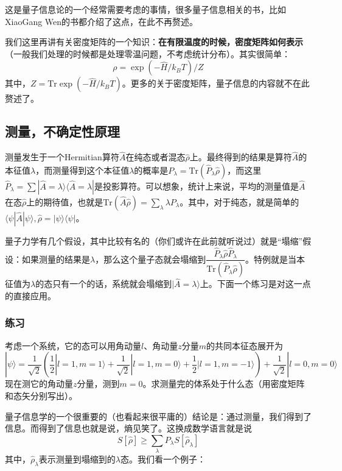 这是量子信息论的一个经常需要考虑的事情，很多量子信息相关的书，比如XiaoGang Wen的书\cite{2015arXiv150802595Z}都介绍了这点，在此不再赘述。


我们这里再讲有关密度矩阵的一个知识：{\bf 在有限温度的时候，密度矩阵如何表示}（一般我们处理的时候都是处理零温问题，不考虑统计分布）。其实很简单：
\begin{equation}
\rho=\exp{(-\hat{H}/k_BT)}/Z
\end{equation}
其中，$Z=\text{Tr}\exp{(-\hat{H}/k_BT)}$。更多的关于密度矩阵，量子信息的内容就不在此赘述了。


\subsection{测量，不确定性原理}

测量发生于一个Hermitian算符$\hat A$在纯态或者混态$\hat\rho$上。最终得到的结果是算符$\hat A$的本征值$\lambda$，而测量得到这个本征值$\lambda$的概率是$P_\lambda=\text{Tr}(\hat{P}_\lambda\hat\rho)$，而这里$\hat P_\lambda=\sum|\hat{A}=\lambda\rangle\langle\hat{A}=\lambda|$是投影算符。可以想象，统计上来说，平均的测量值是$\hat A$在态$\hat\rho$上的期待值，也就是$\text{Tr}(\hat A\hat\rho)=\sum_\lambda \lambda P_\lambda$。其中，对于纯态，就是简单的$\langle\psi|\hat A|\psi\rangle, \hat\rho=|\psi\rangle\langle\psi|$。

量子力学有几个假设，其中比较有名的（你们或许在此前就听说过）就是``塌缩''假设：如果测量的结果是$\lambda$，那么这个量子态就会塌缩到$\dfrac{\hat P_\lambda\hat\rho\hat P_\lambda}{\text{Tr}(\hat P_\lambda\hat\rho)}$。特例就是当本征值为$\lambda$的态只有一个的话，系统就会塌缩到$|\hat{A}=\lambda\rangle$上。下面一个练习是对这一点的直接应用。

\subsubsection{练习}
考虑一个系统，它的态可以用角动量$l$、角动量$z$分量$m$的共同本征态展开为
\begin{equation}
|\psi\rangle = \frac{1}{\sqrt{2}}\left(\frac{1}{2}|l=1,m=1\rangle+\frac{1}{\sqrt{2}}|l=1,m=0\rangle+\frac{1}{2}|l=1,m=-1\rangle\right) + \frac{1}{\sqrt{2}}|l=0,m=0\rangle
\end{equation}
现在测它的角动量$z$分量，测到$m=0$。求测量完的体系处于什么态（用密度矩阵和态矢分别写出）。


量子信息学的一个很重要的（也看起来很平庸的）结论是：通过测量，我们得到了信息。而得到了信息也就是说，熵见笑了。这换成数学语言就是说
\begin{equation}
S[\hat\rho]\ge\sum_\lambda P_\lambda S[\hat\rho_\lambda]
\end{equation}
其中，$\hat\rho_\lambda$表示测量到塌缩到的$\lambda$态。我们看一个例子：

